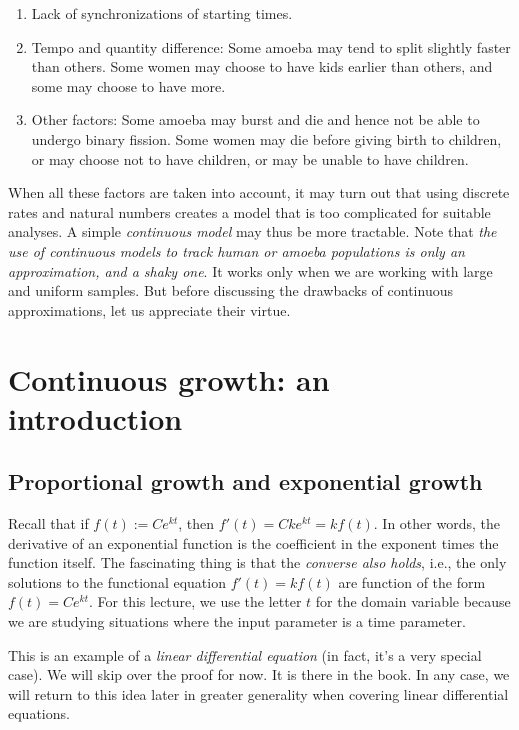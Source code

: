 \documentclass{amsart}
\begin{document}
\begin{enumerate}
\item Lack of synchronizations of starting times.
\item Tempo and quantity difference: Some amoeba may tend to split
  slightly faster than others. Some women may choose to have kids
  earlier than others, and some may choose to have more.
\item Other factors: Some amoeba may burst and die and hence not be
  able to undergo binary fission. Some women may die before giving
  birth to children, or may choose not to have children, or may be
  unable to have children.
\end{enumerate}

When all these factors are taken into account, it may turn out that
using discrete rates and natural numbers creates a model that is too
complicated for suitable analyses. A simple {\em continuous model} may
thus be more tractable. Note that {\em the use of continuous models to
track human or amoeba populations is only an approximation, and a
shaky one}. It works only when we are working with large and uniform
samples. But before discussing the drawbacks of continuous
approximations, let us appreciate their virtue.

\section{Continuous growth: an introduction}

\subsection{Proportional growth and exponential growth}

Recall that if $f(t) := Ce^{kt}$, then $f'(t) = Cke^{kt} = kf(t)$. In
other words, the derivative of an exponential function is the
coefficient in the exponent times the function itself. The fascinating
thing is that the {\em converse also holds}, i.e., the only solutions
to the functional equation $f'(t) = kf(t)$ are function of the form
$f(t) = Ce^{kt}$. For this lecture, we use the letter $t$ for the
domain variable because we are studying situations where the input
parameter is a time parameter.

This is an example of a {\em linear differential equation} (in fact,
it's a very special case). We will skip over the proof for now. It is
there in the book. In any case, we will return to this idea later in
greater generality when covering linear differential equations. 
\end{document}
